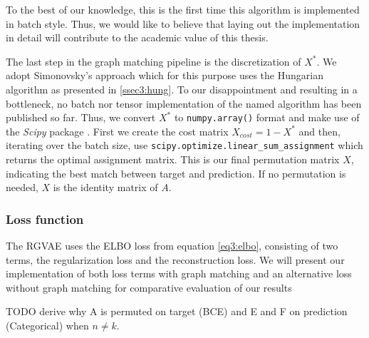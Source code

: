 To the best of our knowledge, this is the first time this algorithm is implemented in batch style. Thus, we would like to believe that laying out the implementation in detail will contribute to the academic value of this thesis.  

The last step in the graph matching pipeline is the discretization of $X^*$. We adopt Simonovsky's \cite{simonovsky_graphvae_2018} approach which for this purpose uses the Hungarian algorithm as presented in \ref{ssec3:hung}. To our disappointment and resulting in a bottleneck, no batch nor tensor implementation of the named algorithm has been published so far. Thus, we convert $X^*$ to \texttt{numpy.array()} format and make use of the \textit{Scipy} package \cite{2020SciPy-NMeth}. First we create the cost matrix $X_{cost} = 1 - X^*$ and then, iterating over the batch size, use \texttt{scipy.optimize.linear\_sum\_assignment} which returns the optimal assignment matrix. This is our final permutation matrix $X$, indicating the best match between target and prediction. If no permutation is needed, $X$ is the identity matrix of $A$.




\subsubsection{Loss function}
\label{ssec4:loss}

The RGVAE uses the ELBO loss from equation \ref{eq3:elbo}, consisting of two terms, the regularization loss and the reconstruction loss. We will present our implementation of both loss terms with graph matching and an alternative loss without graph matching for comparative evaluation of our results 


TODO derive why A is permuted on target (BCE) and E and F on prediction (Categorical) when $n \neq k$.

